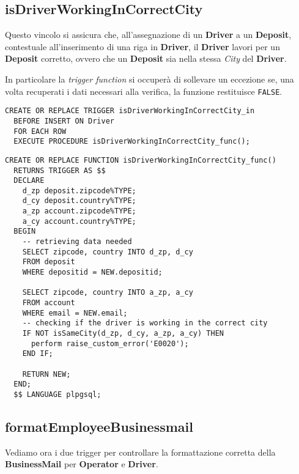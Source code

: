 \subsection{\textbf{isDriverWorkingInCorrectCity}}

Questo vincolo si assicura che, all'assegnazione di un \textbf{Driver} a un \textbf{Deposit}, contestuale all'inserimento di una riga in \textbf{Driver}, il \textbf{Driver} lavori per un \textbf{Deposit} corretto, ovvero che un \textbf{Deposit} sia nella stessa \textit{City} del \textbf{Driver}.

In particolare la \textit{trigger function} si occuperà di sollevare un eccezione se, una volta recuperati i dati necessari alla verifica, la funzione  restituisce \lstinline{FALSE}.

\begin{lstlisting}[caption={Trigger per il vincolo \textbf{isDriverWorkingInCorrectCity}}]
  CREATE OR REPLACE TRIGGER isDriverWorkingInCorrectCity_in
  BEFORE INSERT ON Driver
  FOR EACH ROW
  EXECUTE PROCEDURE isDriverWorkingInCorrectCity_func();
\end{lstlisting}
\newpage
\begin{lstlisting}[caption={Funzione per il vincolo \textbf{isDriverWorkingInCorrectCity}}]
  CREATE OR REPLACE FUNCTION isDriverWorkingInCorrectCity_func()
  RETURNS TRIGGER AS $$
  DECLARE
    d_zp deposit.zipcode%TYPE;
    d_cy deposit.country%TYPE;
    a_zp account.zipcode%TYPE;
    a_cy account.country%TYPE;
  BEGIN
    -- retrieving data needed
    SELECT zipcode, country INTO d_zp, d_cy
    FROM deposit
    WHERE depositid = NEW.depositid;

    SELECT zipcode, country INTO a_zp, a_cy
    FROM account
    WHERE email = NEW.email;
    -- checking if the driver is working in the correct city
    IF NOT isSameCity(d_zp, d_cy, a_zp, a_cy) THEN
      perform raise_custom_error('E0020');
    END IF;
    
    RETURN NEW;
  END;
  $$ LANGUAGE plpgsql;
\end{lstlisting}

\subsection{\textbf{formatEmployeeBusinessmail}}

Vediamo ora i due trigger per controllare la formattazione corretta della \textbf{BusinessMail} per \textbf{Operator} e \textbf{Driver}.

